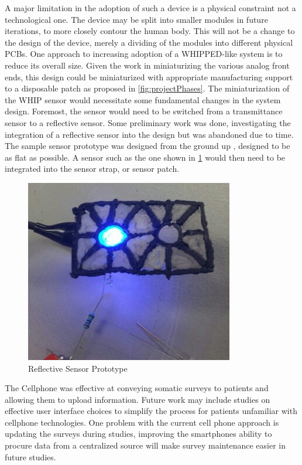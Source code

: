 A major limitation in the adoption of such a device is a physical constraint not a technological one. The device may be split into smaller modules in future iterations, to more closely contour the human body. This will not be a change to the design of the device, merely a dividing of the modules into different physical PCBs. One approach to increasing adoption of a WHIPPED-like system is to reduce its overall size. Given the work in miniaturizing the various analog front ends\cite{AFE4490}\cite{ADS1293}, this design could be miniaturized with appropriate manufacturing support to a disposable patch as proposed in \cref{fig:projectPhases}. The miniaturization of the WHIP sensor would necessitate some fundamental changes in the system design. Foremost, the  sensor would need to be switched from a transmittance sensor to a reflective sensor. Some preliminary work was done, investigating the integration of a reflective sensor into the design but was abandoned due to time. The sample sensor prototype was designed from the ground up , designed to be as flat as possible. A sensor such as the one shown in  \cref{fig:ReflectiveSensorPrototypes} would then need to be integrated into the sensor strap, or sensor patch.

\begin{figure}
\centering
\includegraphics[width=0.7\linewidth]{Images/ReflectiveSensorPrototype.png}
\caption{Reflective Sensor Prototype }
\label{fig:ReflectiveSensorPrototypes}
\end{figure}


The Cellphone was effective at conveying somatic surveys to patients and allowing them to upload information. Future work may include studies on effective user interface choices to simplify the process for patients unfamiliar with cellphone technologies. One problem with the current cell phone approach is updating the surveys during studies, improving the smartphones ability to procure data from a centralized source will make survey maintenance easier in future studies.

